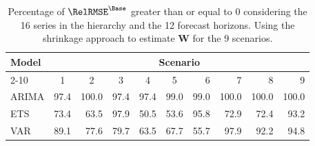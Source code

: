 \begin{table}[!htb]
  \caption{Percentage of $\RelRMSE^{\Base}$ greater than or equal to 0 considering the 16 series in the hierarchy and the 12 forecast horizons. Using the shrinkage approach to estimate $\bm{W}$ for the 9 scenarios.}
  \centering
  \begin{tabular}{lrrrrrrrrr}
    \hline
    \multirow{2}{*}{Model} & \multicolumn{9}{c}{Scenario} \\ \cline{2-10}
    & \multicolumn{1}{c}{1} & \multicolumn{1}{c}{2} & \multicolumn{1}{c}{3} & \multicolumn{1}{c}{4} & \multicolumn{1}{c}{5} & 6 & 7 & 8 & 9 \\ \hline
    ARIMA & 97.4 & 100.0 & 97.4 & 97.4 & 99.0 & 99.0 & 100.0 & 100.0 & 100.0 \\
    ETS & 73.4 & 63.5 & 97.9 & 50.5 & 53.6 & 95.8 & 72.9 & 72.4 & 93.2 \\
    VAR & 89.1 & 77.6 & 79.7 & 63.5 & 67.7 & 55.7 & 97.9 & 92.2 & 94.8 \\
    \hline
  \end{tabular}%
  \label{tab:porc_sh}
\end{table}
